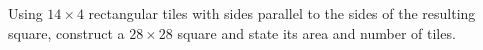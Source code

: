 Using $14\times4$ rectangular tiles with sides parallel to the sides of the resulting square, construct a $28\times28$ square and state its area and number of tiles.
